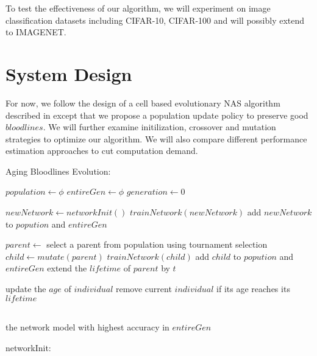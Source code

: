 \documentclass{article}
\begin{document}
\begin{normalsize}
    To test the effectiveness of our algorithm, we will experiment on image classification datasets including CIFAR-10, CIFAR-100 and will possibly extend to IMAGENET.


  \section{System Design}

  For now, we follow the design of a cell based evolutionary NAS algorithm described in\cite{DBLP:journals/corr/abs-1802-01548} except that we propose a population update policy to preserve good $bloodlines$. We will further examine initilization, crossover and mutation strategies to optimize our algorithm. We will also compare different performance estimation approaches to cut computation demand.

  \begin{algorithm}[htb]  
    \caption{ Aging Bloodlines Evolution:}
    \begin{algorithmic}[1]  
  
    \State $population\gets \phi$
    \State $entireGen\gets \phi$
    \State $generation\gets 0$
    
    \State $newNetwork\gets networkInit()$
    \State $trainNetwork(newNetwork)$
    \State add $newNetwork$ to $popution$ and $entireGen$
    \EndWhile
    
  
    
      \State $parent\gets$ select a parent from population using tournament selection 
      \State $child \gets mutate(parent)$
      \State $trainNetwork(child)$
      \State add $child$ to $popution$ and $entireGen$
        \State extend the $lifetime$ of $parent$ by $t$
      \EndIf
      
        \State update the $age$ of $individual$
        \State remove current $individual$ if its age reaches its $lifetime$
      \EndFor
      
      
    \EndWhile
    
    
    \\  
    \Return the network model with highest accuracy in $entireGen$
 
  \end{algorithmic}  
  \end{algorithm}  


 \begin{algorithm}[H]  
	\caption{ networkInit:}
	

\end{algorithm}
\end{normalsize}
\end{document}
